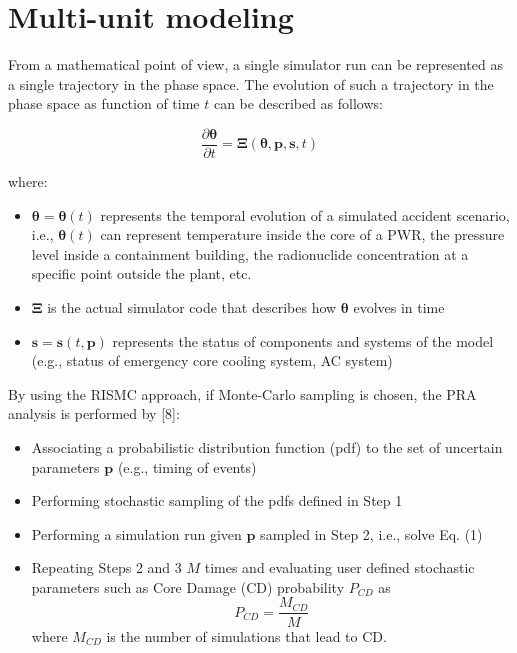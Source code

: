 \section{Multi-unit modeling}
\label{sec:multiUnitModeling}

From a mathematical point of view, a single simulator run can be represented 
as a single trajectory in the phase space. The evolution of such a trajectory 
in the phase space as function of time $t$ can be described as follows:

\begin{equation}
    \frac{\partial \boldsymbol \theta }{\partial t}  = \boldsymbol \Xi (\boldsymbol \theta , \boldsymbol p, \boldsymbol s , t) 
    \label{eq:trajectory}
\end{equation}

where:
\begin{itemize}
  \item $\boldsymbol \theta = \boldsymbol \theta(t)$ represents the temporal 
        evolution of a simulated accident scenario, i.e., $\boldsymbol \theta(t)$ can 
        represent temperature inside the core of a PWR, the pressure level inside a containment
        building, the radionuclide concentration at a specific point outside the plant, etc.
  \item $\boldsymbol \Xi$ is the actual simulator code that describes how $\boldsymbol \theta$ 
        evolves in time
  \item $\boldsymbol s = \boldsymbol s(t,\boldsymbol p)$ represents the status of components 
        and systems of the model (e.g., status of emergency core cooling system, AC system)
\end{itemize}

By using the RISMC approach, if Monte-Carlo sampling is chosen, the PRA analysis is performed by [8]:
\begin{itemize}
  \item Associating a probabilistic distribution function (pdf) to the set of uncertain 
        parameters $\boldsymbol p$ (e.g., timing of events)
  \item Performing stochastic sampling of the pdfs defined in Step 1
  \item Performing a simulation run given $\boldsymbol p$ sampled in Step 2, i.e., solve Eq. (1)
  \item Repeating Steps 2 and 3 $M$ times and evaluating user defined stochastic parameters such as 
        Core Damage (CD) probability $P_{CD}$ as
        \begin{equation}
            P_{CD} = \frac{M_{CD}}{M} 
            \label{eq:CDprobability}
        \end{equation}
        where $M_{CD}$ is the number of simulations that lead to CD. 
\end{itemize}

